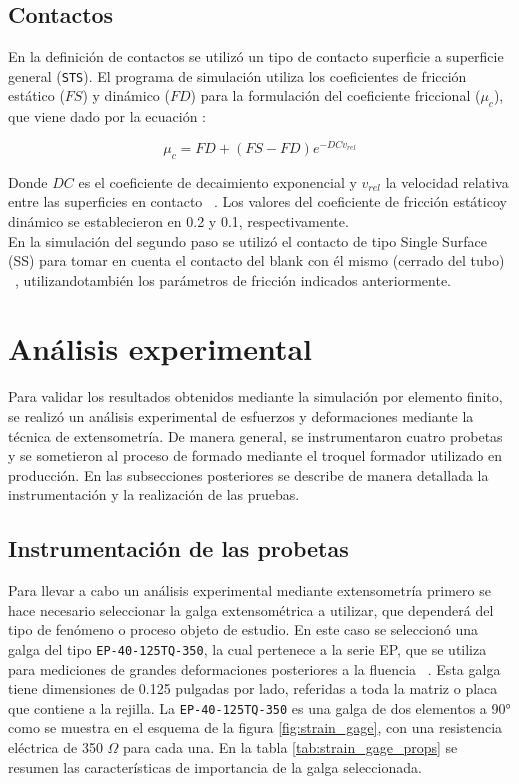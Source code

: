 \subsection{Contactos}

En la definición de contactos se utilizó un tipo de contacto superficie a superficie
general (\texttt{STS}). El programa de simulación utiliza los coeficientes de fricción 
estático ($FS$) y dinámico ($FD$) para la formulación del coeficiente friccional ($\mu_c$),
que viene dado por la ecuación :

\begin{equation}
\mu_c = FD + (FS - FD) e^{-DCv_{rel}}
\label{eq:frictional_coeff}
\end{equation}

Donde $DC$ es el coeficiente de decaimiento exponencial y $v_{rel}$ la velocidad relativa
entre las superficies en contacto ~\cite{lsdyna-manual}. Los valores del coeficiente de 
fricción estáticoy dinámico se establecieron en 0.2 y 0.1, respectivamente. ~\cite{carvill1993} \\

En la simulación del segundo paso se utilizó el contacto de tipo Single Surface (SS) para 
tomar en cuenta el contacto del blank con él mismo (cerrado del tubo) ~\cite{lsdyna-manual}, 
utilizandotambién los parámetros de fricción indicados anteriormente.

\section{Análisis experimental}

Para validar los resultados obtenidos mediante la simulación por elemento finito, se realizó 
un análisis experimental de esfuerzos y deformaciones mediante la técnica de extensometría. 
De manera general, se instrumentaron cuatro probetas y se sometieron al proceso de formado 
mediante el troquel formador utilizado en producción. En las subsecciones posteriores se describe 
de manera detallada la instrumentación y la realización de las pruebas.

\subsection{Instrumentación de las probetas}

Para llevar a cabo un análisis experimental mediante extensometría primero se hace necesario 
seleccionar la galga extensométrica a utilizar, que dependerá del tipo de fenómeno o proceso 
objeto de estudio. En este caso se seleccionó una galga del tipo \texttt{EP-40-125TQ-350}, la 
cual pertenece a la serie EP, que se utiliza para mediciones de grandes deformaciones posteriores 
a la fluencia ~\cite{vishay-catalog}. Esta galga tiene dimensiones de 0.125 pulgadas por lado, referidas a toda la 
matriz o placa que contiene a la rejilla. La \texttt{EP-40-125TQ-350} es una galga de dos 
elementos a 90° como se muestra en el esquema de la figura \ref{fig:strain_gage}, con 
una resistencia eléctrica de 350 $\Omega$ para cada una. En la tabla \ref{tab:strain_gage_props} 
se resumen las características de importancia de la galga seleccionada.

